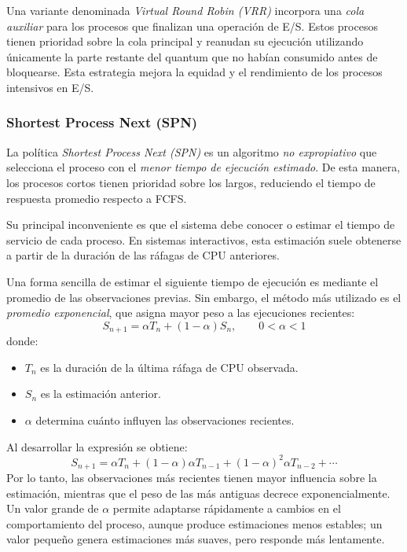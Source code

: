 Una variante denominada \textit{Virtual Round Robin (VRR)} incorpora una \textit{cola auxiliar} para los procesos que finalizan una operación de E/S. Estos procesos tienen prioridad sobre la cola principal y reanudan su ejecución utilizando únicamente la parte restante del quantum que no habían consumido antes de bloquearse. Esta estrategia mejora la equidad y el rendimiento de los procesos intensivos en E/S.

\subsubsection{Shortest Process Next (SPN)}

La política \textit{Shortest Process Next (SPN)} es un algoritmo \textit{no expropiativo} que selecciona el proceso con el \textit{menor tiempo de ejecución estimado}. De esta manera, los procesos cortos tienen prioridad sobre los largos, reduciendo el tiempo de respuesta promedio respecto a FCFS.

Su principal inconveniente es que el sistema debe conocer o estimar el tiempo de servicio de cada proceso. En sistemas interactivos, esta estimación suele obtenerse a partir de la duración de las ráfagas de CPU anteriores.

Una forma sencilla de estimar el siguiente tiempo de ejecución es mediante el promedio de las observaciones previas. Sin embargo, el método más utilizado es el \textit{promedio exponencial}, que asigna mayor peso a las ejecuciones recientes:
\[
S_{n+1}=\alpha T_n+(1-\alpha)S_n,\qquad 0<\alpha<1
\]
donde:
\begin{itemize}
  \item \(T_n\) es la duración de la última ráfaga de CPU observada.
  \item \(S_n\) es la estimación anterior.
  \item \(\alpha\) determina cuánto influyen las observaciones recientes.
\end{itemize}
Al desarrollar la expresión se obtiene:
\[
S_{n+1}
=\alpha T_n
+(1-\alpha)\alpha T_{n-1}
+(1-\alpha)^2\alpha T_{n-2}
+\cdots
\]
Por lo tanto, las observaciones más recientes tienen mayor influencia sobre la estimación, mientras que el peso de las más antiguas decrece exponencialmente. Un valor grande de \(\alpha\) permite adaptarse rápidamente a cambios en el comportamiento del proceso, aunque produce estimaciones menos estables; un valor pequeño genera estimaciones más suaves, pero responde más lentamente.

